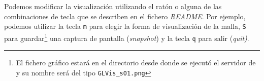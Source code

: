Podemos modificar la visualización utilizando el ratón o alguna de las
combinaciones de tecla que se describen en el fichero
\href{https://raw.githubusercontent.com/glvis/glvis/master/README}{\textit{README}}. Por
ejemplo, podemos utilizar la tecla \texttt{m} para elegir la forma de
visualización de la malla, \texttt{S} para guardar\footnote{El fichero
  gráfico estará en el directorio desde donde se ejecutó el servidor
  de \glvis y su nombre será del tipo \texttt{GLVis\_s01.png}} una
captura de pantalla (\textit{snapshot}) y la tecla \texttt{q} para
salir (\textit{quit)}.

